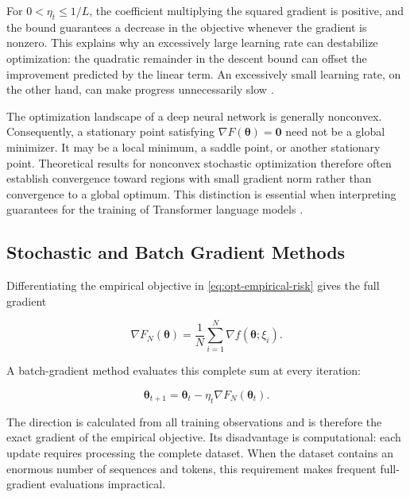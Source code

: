 For $0<\eta_t\leq 1/L$, the coefficient multiplying the squared gradient
is positive, and the bound guarantees a decrease in the objective whenever
the gradient is nonzero. This explains why an excessively large learning
rate can destabilize optimization: the quadratic remainder in the descent
bound can offset the improvement predicted by the linear term. An
excessively small learning rate, on the other hand, can make progress
unnecessarily slow \parencite{Bottou2018Optimization}.

The optimization landscape of a deep neural network is generally nonconvex.
Consequently, a stationary point satisfying
$\nabla F(\boldsymbol{\theta})=\mathbf{0}$ need not be a global minimizer.
It may be a local minimum, a saddle point, or another stationary point.
Theoretical results for nonconvex stochastic optimization therefore often
establish convergence toward regions with small gradient norm rather than
convergence to a global optimum. This distinction is essential when
interpreting guarantees for the training of Transformer language models
\parencite{Bottou2018Optimization,Ranganath2026Navigating}.

\subsection{Stochastic and Batch Gradient Methods}
\label{subsec:optimization-stochastic-batch}

Differentiating the empirical objective in
\cref{eq:opt-empirical-risk} gives the full gradient

\begin{equation}
    \nabla F_N(\boldsymbol{\theta})
    =
    \frac{1}{N}
    \sum_{i=1}^{N}
    \nabla f(\boldsymbol{\theta};\xi_i).
    \label{eq:opt-full-gradient}
\end{equation}

A batch-gradient method evaluates this complete sum at every iteration:

\begin{equation}
    \boldsymbol{\theta}_{t+1}
    =
    \boldsymbol{\theta}_t
    -
    \eta_t\nabla F_N(\boldsymbol{\theta}_t).
    \label{eq:opt-batch-gradient}
\end{equation}

The direction is calculated from all training observations and is therefore
the exact gradient of the empirical objective. Its disadvantage is
computational: each update requires processing the complete dataset. When
the dataset contains an enormous number of sequences and tokens, this
requirement makes frequent full-gradient evaluations impractical.

